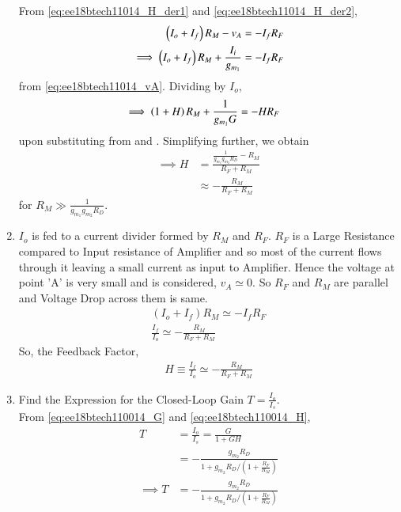 \begin{enumerate}[label=\thesection.\arabic*.,ref=\thesection.\theenumi]
From \eqref{eq:ee18btech11014_H_der1}
 and \eqref{eq:ee18btech11014_H_der2},
\begin{align}
\left(I_o + I_f\right)R_M - v_{A} &= -I_fR_F
\\
\implies \left(I_o + I_f\right)R_M + \frac{I_i}{g_{m_1}} &=-I_fR_F
\end{align}
from  \eqref{eq:ee18btech11014_vA}. Dividing by  $I_o $,%
\begin{align}
\implies \left(1 + H\right)R_M + \frac{1}{g_{m_1}G} &=-HR_F 
\end{align}
%
upon substituting from \label{eq:ee18btech11014_G}
and \label{eq:ee18btech11014_Hdef}.  Simplifying further, we obtain
%
\begin{align}
\implies H &= \frac{\frac{1}{g_{m_1}g_{m_2}R_D} - R_M}{R_F+R_M}
\\
& \approx  -\frac{ R_M}{R_F+R_M}
\end{align}
%
for $R_M \gg \frac{1}{g_{m_1}g_{m_2}R_D}$. 
%
\item 
$I_{o}$ is fed to a current divider formed by $R_{M}$ and $R_{F}$.
$R_{F}$ is a Large Resistance compared to Input resistance of Amplifier and so most of the current flows through it leaving a small current as input to Amplifier. Hence the voltage at point 'A' is very small and is considered, $v_{A} \simeq 0$. So $R_{F}$ and $R_{M}$ are parallel and Voltage Drop across them is same.
\begin{align}
(I_{o} + I_{f})R_{M} \simeq -I_{f}R_{F}\\
\frac{I_{f}}{I_{o}} \simeq -\frac{R_{M}}{R_{F}+R_{M}}
\end{align}
So, the Feedback Factor,
\begin{align}
\label{eq:ee18btech110014_H}
H \equiv \frac{I_{f}}{I_{o}} \simeq-\frac{R_{M}}{R_{F}+R_{M}}
\end{align}
\item Find the Expression for the Closed-Loop Gain $T=\frac{I_{o}}{I_{s}}$. 
\\
\solution 
From \eqref{eq:ee18btech110014_G}
 and \eqref{eq:ee18btech110014_H},
\begin{align}
\label{eq:ee18btech110014_T}
T &= \frac{I_{o}}{I_{s}} = \frac{G}{1+GH}\\
&=-\frac{g_{m_{2}} R_{D}}{1+g_{m_{2}} R_{D} /\left(1+\frac{R_{F}}{R_{M}}\right)}
\\
\implies T &= -\frac{g_{m_{2}} R_{D}}{1+g_{m_{2}} R_{D} /\left(1+\frac{R_{F}}{R_{M}}\right)}
\end{align}

\end{enumerate}
